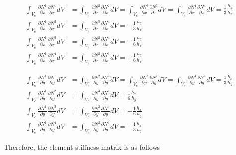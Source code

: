 \begin{align}
\int_{V_e}\frac{\partial N^1}{\partial x}\frac{\partial N^1}{\partial x}dV
&= \int_{V_e}\frac{\partial N^2}{\partial x}\frac{\partial N^2}{\partial x}dV
= \int_{V_e}\frac{\partial N^3}{\partial x}\frac{\partial N^3}{\partial x}dV
= \int_{V_e}\frac{\partial N^4}{\partial x}\frac{\partial N^4}{\partial x}dV
= \frac{1}{3}\frac{h_y}{h_x}\\
\int_{V_e}\frac{\partial N^1}{\partial x}\frac{\partial N^2}{\partial x}dV
&= \int_{V_e}\frac{\partial N^3}{\partial x}\frac{\partial N^4}{\partial x}dV
= -\frac{1}{3}\frac{h_y}{h_x}\\
\int_{V_e}\frac{\partial N^1}{\partial x}\frac{\partial N^3}{\partial x}dV
&= \int_{V_e}\frac{\partial N^2}{\partial x}\frac{\partial N^4}{\partial x}dV
= -\frac{1}{6}\frac{h_y}{h_x}\\
\int_{V_e}\frac{\partial N^1}{\partial x}\frac{\partial N^4}{\partial x}dV
&= \int_{V_e}\frac{\partial N^2}{\partial x}\frac{\partial N^3}{\partial x}dV
= +\frac{1}{6}\frac{h_y}{h_x}
\end{align}



\begin{align}
\int_{V_e}\frac{\partial N^1}{\partial y}\frac{\partial N^1}{\partial y}dV
&= \int_{V_e}\frac{\partial N^2}{\partial y}\frac{\partial N^2}{\partial y}dV
= \int_{V_e}\frac{\partial N^3}{\partial y}\frac{\partial N^3}{\partial y}dV
= \int_{V_e}\frac{\partial N^4}{\partial y}\frac{\partial N^4}{\partial y}dV
= \frac{1}{3}\frac{h_x}{h_y}\\
\int_{V_e}\frac{\partial N^1}{\partial y}\frac{\partial N^2}{\partial y}dV
&= \int_{V_e}\frac{\partial N^3}{\partial y}\frac{\partial N^4}{\partial y}dV
= \frac{1}{6}\frac{h_x}{h_y}\\
\int_{V_e}\frac{\partial N^1}{\partial y}\frac{\partial N^3}{\partial y}dV
&= \int_{V_e}\frac{\partial N^2}{\partial y}\frac{\partial N^4}{\partial y}dV
= -\frac{1}{6}\frac{h_x}{h_y}\\
\int_{V_e}\frac{\partial N^1}{\partial y}\frac{\partial N^4}{\partial y}dV
&= \int_{V_e}\frac{\partial N^2}{\partial y}\frac{\partial N^3}{\partial y}dV
= -\frac{1}{3}\frac{h_x}{h_y}
\end{align}


Therefore, the element stiffness matrix is ​​as follows

